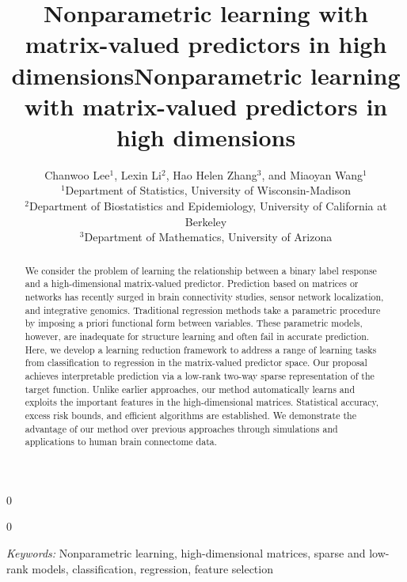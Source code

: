 \documentclass[11pt]{article}
\newcommand{\blind}{0}
\theoremstyle{definition}
\begin{document}
\blind
{   \date{}
  \title{\vspace*{-2cm}\bf Nonparametric learning with matrix-valued predictors in high dimensions}
\author{\vspace*{-.2cm} Chanwoo Lee$^{1}$, Lexin Li$^2$, Hao Helen Zhang$^3$, and Miaoyan Wang$^1$\\\vspace*{-.2cm}
$^1$Department of Statistics, University of Wisconsin-Madison\\
$^2$Department of Biostatistics and Epidemiology, University of California at Berkeley\\
$^3$Department of Mathematics, University of Arizona\\
}

    \maketitle
} \fi

\blind
{
 \date{}
  \title{\vspace*{-1cm}\bf Nonparametric learning with matrix-valued predictors in high dimensions}
\author{}
\maketitle
} \fi

\vspace{-2cm}
\begin{abstract}
We consider the problem of learning the relationship between a binary label response and a high-dimensional matrix-valued predictor. Prediction based on matrices or networks has recently surged in brain connectivity studies, sensor network localization, and integrative genomics. Traditional regression methods take a parametric procedure by imposing a priori functional form between variables. These parametric models, however, are inadequate for structure learning and often fail in accurate prediction. Here, we develop a learning reduction framework to address a range of learning tasks from classification to regression in the matrix-valued predictor space. Our proposal achieves interpretable prediction via a low-rank two-way sparse representation of the target function. Unlike earlier approaches, our method automatically learns and exploits the important features in the high-dimensional matrices. Statistical accuracy, excess risk bounds, and efficient algorithms are established. We demonstrate the advantage of our method over previous approaches through simulations and applications to human brain connectome data. 

\end{abstract}
\noindent%
{\it Keywords:}  Nonparametric learning, high-dimensional matrices, sparse and low-rank models, classification, regression, feature selection
\end{document}

